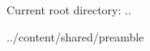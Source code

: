 \documentclass[10pt,a4paper]{article}
\providecommand{\rootpath}{..}
\begin{document}
Current root directory: \rootpath %

\rootpath/content/shared/preamble
\end{document}
